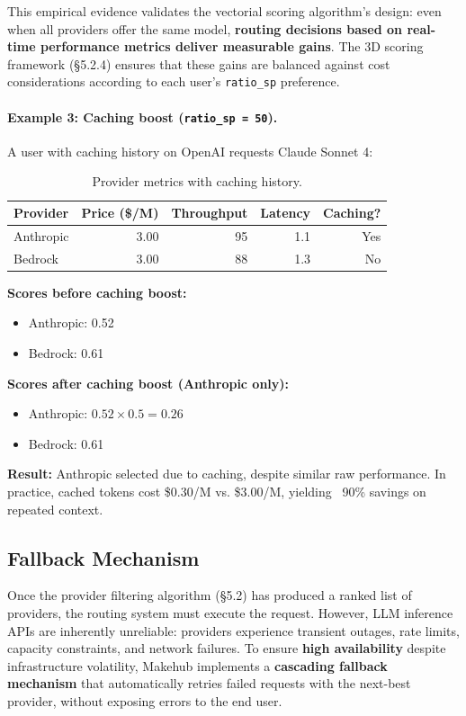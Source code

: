 \documentclass[english]{article}
\begin{document}
This empirical evidence validates the vectorial scoring algorithm's design: even when all providers offer the same model, \textbf{routing decisions based on real-time performance metrics deliver measurable gains}. The 3D scoring framework (§5.2.4) ensures that these gains are balanced against cost considerations according to each user's \texttt{ratio\_sp} preference.

\paragraph{Example 3: Caching boost (\texttt{ratio\_sp = 50}).}

A user with caching history on OpenAI requests Claude Sonnet 4:

\begin{table}[H]
\centering
\caption{Provider metrics with caching history.}
\begin{tabular}{|l|r|r|r|r|}
\hline
\textbf{Provider} & \textbf{Price (\$/M)} & \textbf{Throughput} & \textbf{Latency} & \textbf{Caching?} \\
\hline
Anthropic & 3.00 & 95 & 1.1 & Yes \\
Bedrock & 3.00 & 88 & 1.3 & No \\
\hline
\end{tabular}
\end{table}

\textbf{Scores before caching boost:}
\begin{itemize}
    \item Anthropic: 0.52
    \item Bedrock: 0.61
\end{itemize}

\textbf{Scores after caching boost (Anthropic only):}
\begin{itemize}
    \item Anthropic: $0.52 \times 0.5 = 0.26$
    \item Bedrock: 0.61
\end{itemize}

\textbf{Result:} Anthropic selected due to caching, despite similar raw performance. In practice, cached tokens cost \$0.30/M vs. \$3.00/M, yielding ~90\% savings on repeated context.

\subsection{Fallback Mechanism}

Once the provider filtering algorithm (§5.2) has produced a ranked list of providers, the routing system must execute the request. However, LLM inference APIs are inherently unreliable: providers experience transient outages, rate limits, capacity constraints, and network failures. To ensure \textbf{high availability} despite infrastructure volatility, Makehub implements a \textbf{cascading fallback mechanism} that automatically retries failed requests with the next-best provider, without exposing errors to the end user.
\end{document}
